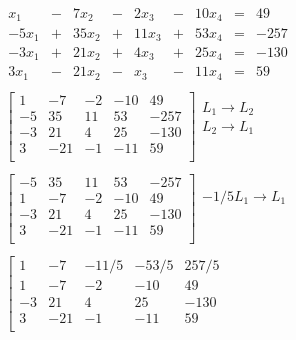 \documentclass[]{article}
\begin{document}
\[
\begin{array}{rrrrrrrrr}
x_{1} & - & 7 x_{2} & - & 2 x_{3} & - & 10 x_{4} & = & 49 \\ 
-5 x_{1} & + & 35 x_{2} & + & 11 x_{3} & + & 53 x_{4} & = & -257 \\ 
-3 x_{1} & + & 21 x_{2} & + & 4 x_{3} & + & 25 x_{4} & = & -130 \\ 
3 x_{1} & - & 21 x_{2} & - & x_{3} & - & 11 x_{4} & = & 59 \\ 
\end{array}
\]\[
\begin{array}{l}
\left[
\begin{array}{rrrr|r}
1 & -7 & -2 & -10 & 49 \\ 
-5 & 35 & 11 & 53 & -257 \\ 
-3 & 21 & 4 & 25 & -130 \\ 
3 & -21 & -1 & -11 & 59 \\ 
\end{array}
\right]\begin{array}{l}
L_{1} \rightarrow L_{2}\\ 
L_{2} \rightarrow L_{1}\\ 
\\ 
\\ 
\end{array}\\
 \\
\left[
\begin{array}{rrrr|r}
-5 & 35 & 11 & 53 & -257 \\ 
1 & -7 & -2 & -10 & 49 \\ 
-3 & 21 & 4 & 25 & -130 \\ 
3 & -21 & -1 & -11 & 59 \\ 
\end{array}
\right]\begin{array}{l}
-1/5 L_{1} \rightarrow L_{1}\\ 
\\ 
\\ 
\\ 
\end{array}\\
 \\
\left[
\begin{array}{rrrr|r}
1 & -7 & -11/5 & -53/5 & 257/5 \\ 
1 & -7 & -2 & -10 & 49 \\ 
-3 & 21 & 4 & 25 & -130 \\ 
3 & -21 & -1 & -11 & 59 \\ 
\end{array}

\end{array}\]
\end{document}
